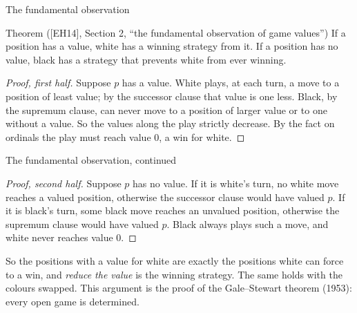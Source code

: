 \documentclass[aspectratio=169,10pt]{beamer}
\newcommand{\EH}{[EH14]}
\begin{document}
\begin{frame}{The fundamental observation}
  \begin{block}{Theorem (\EH, Section 2, ``the fundamental observation of game values'')}
    If a position has a value, white has a winning strategy from it.
    If a position has no value, black has a strategy that prevents white from ever winning.
  \end{block}
  \begin{proof}[Proof, first half]
    Suppose $p$ has a value. White plays, at each turn, a move to a position of least value; by the
    successor clause that value is one less. Black, by the supremum clause, can never move to a position of
    larger value or to one without a value. So the values along the play strictly decrease. By the fact on
    ordinals the play must reach value $0$, a win for white.
  \end{proof}
\end{frame}

\begin{frame}{The fundamental observation, continued}
  \begin{proof}[Proof, second half]
    Suppose $p$ has no value. If it is white's turn, no white move reaches a valued position, otherwise the
    successor clause would have valued $p$. If it is black's turn, some black move reaches an unvalued
    position, otherwise the supremum clause would have valued $p$. Black always plays such a move, and white
    never reaches value $0$.
  \end{proof}
  \vskip 0.3cm
  So the positions with a value for white are exactly the positions white can force to a win, and
  \emph{reduce the value} is the winning strategy. The same holds with the colours swapped.
  \vskip 0.3cm
   This argument is the proof of the Gale--Stewart theorem (1953): every open game is determined.
\end{frame}
\end{document}
